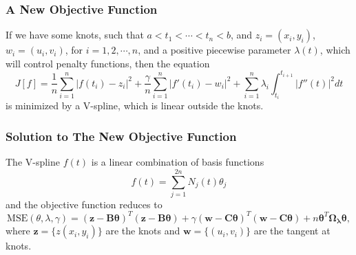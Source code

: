 \documentclass{beamer}
\begin{document}
\begin{frame}
\frametitle{A New Objective Function}
If we have some knots, such that $a<t_1<\cdots <t_n<b$, and $z_i=(x_i,y_i)$, $w_i=(u_i,v_i)$, for $i=1,2,\cdots,n$, and a positive piecewise parameter $\lambda(t)$, which will control penalty functions, then the equation
\begin{equation}\label{obtractor}
J[f]=\frac{1}{n}\sum_{i=1}^n|f(t_i)-z_i|^2+\frac{\gamma}{n}\sum_{i=1}^{n}|f'(t_i)-w_i|^2+\sum_{i=1}^n\lambda_i\int_{t_i}^{t_{i+1}}|f''(t)|^2 dt
\end{equation}
is minimized by a V-spline, which is linear outside the knots. 
\end{frame}


\begin{frame}
\frametitle{Solution to The New Objective Function}
The V-spline $f(t)$ is a linear combination of basis functions
\begin{equation*}
f(t)=\sum_{j=1}^{2n} N_j(t)\theta_j 
\end{equation*}
and the objective function reduces to
\begin{equation*}
\mbox{MSE}(\theta,\lambda,\gamma)=(\mathbf{z}-\mathbf{B}\mathbf{\theta})^T(\mathbf{z}-\mathbf{B}\mathbf{\theta})+\gamma(\mathbf{w}-\mathbf{C}\mathbf{\theta})^T(\mathbf{w}-\mathbf{C}\mathbf{\theta})+n\mathbf{\theta}^T\mathbf{\Omega_\lambda}\mathbf{\theta},
\end{equation*}
where $\mathbf{z}=\{z(x_i,y_i)\}$ are the knots and $\mathbf{w}=\{(u_i,v_i)\}$ are the tangent at knots.
\end{frame}


\end{document}
